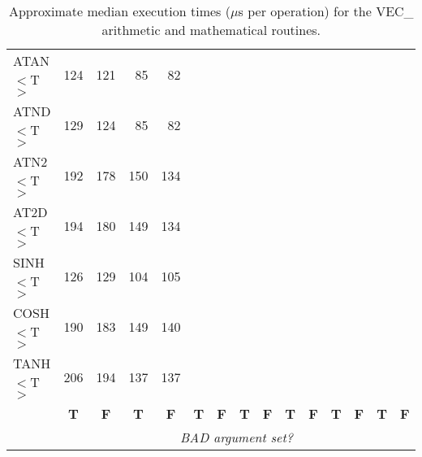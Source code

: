 \documentclass[11pt,nolof]{starlink}
\providecommand{\name}[1]{\mbox{#1}}
\begin{document}
\begin{table}[h]
\begin{center}
\begin{scriptsize}
\begin{tabular}{|l|r|r||r|r||r|r||r|r||r|r||r|r||r|r|}
ATAN$<$T$>$ &  124 &  121 &   85 &   82 &      &      &      &      &      &      &      &      &      &      \\
ATND$<$T$>$ &  129 &  124 &   85 &   82 &      &      &      &      &      &      &      &      &      &      \\
ATN2$<$T$>$ &  192 &  178 &  150 &  134 &      &      &      &      &      &      &      &      &      &      \\
AT2D$<$T$>$ &  194 &  180 &  149 &  134 &      &      &      &      &      &      &      &      &      &      \\
SINH$<$T$>$ &  126 &  129 &  104 &  105 &      &      &      &      &      &      &      &      &      &      \\
COSH$<$T$>$ &  190 &  183 &  149 &  140 &      &      &      &      &      &      &      &      &      &      \\
TANH$<$T$>$ &  206 &  194 &  137 &  137 &      &      &      &      &      &      &      &      &      &      \\
\hline
\multicolumn{1}{c}{} &
\multicolumn{1}{|c}{\textbf{T}} & \multicolumn{1}{|c||}{\textbf{F}} &
\multicolumn{1}{c}{\textbf{T}} & \multicolumn{1}{|c||}{\textbf{F}} &
\multicolumn{1}{c}{\textbf{T}} & \multicolumn{1}{|c||}{\textbf{F}} &
\multicolumn{1}{c}{\textbf{T}} & \multicolumn{1}{|c||}{\textbf{F}} &
\multicolumn{1}{c}{\textbf{T}} & \multicolumn{1}{|c||}{\textbf{F}} &
\multicolumn{1}{c}{\textbf{T}} & \multicolumn{1}{|c||}{\textbf{F}} &
\multicolumn{1}{c}{\textbf{T}} & \multicolumn{1}{|c|}{\textbf{F}}\\
\cline{2-15}
\multicolumn{1}{c}{} &
\multicolumn{14}{|c|}{\emph{BAD argument set?}}\\
\cline{2-15}
\end{tabular}
\end{scriptsize}
\caption{Approximate median execution times ($\mu$s per operation) for the
\name{VEC\_} arithmetic and mathematical routines.}
\label{table:vecstats}
\end{center}
\end{table}

\newpage
\end{document}
